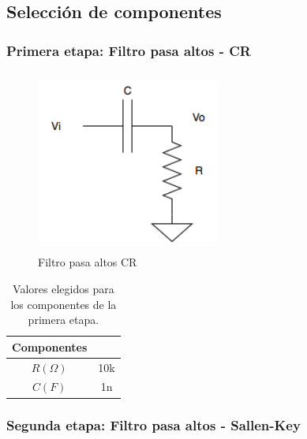 \subsection{Selecci\'on de componentes}

\subsubsection{Primera etapa: Filtro pasa altos  - CR}

 \begin{figure}[H] %
	\centering
	\includegraphics[width=6cm,height=6cm,keepaspectratio]{../Imagenes/CR.png}
	\caption{Filtro pasa altos CR}
	\label{cr}
\end{figure}

\begin{table}[H] 
	\centering
	\begin{tabular}{c c}
		Componentes \\
		\hline
		$R (\Omega)$ & 10k  \\
		$C (F)$ & 1n \\
		\hline
	\end{tabular}
	\caption{Valores elegidos para los componentes de la primera etapa.}
	\label{componentes1}
\end{table}

\subsubsection{Segunda etapa: Filtro pasa altos - Sallen-Key}

